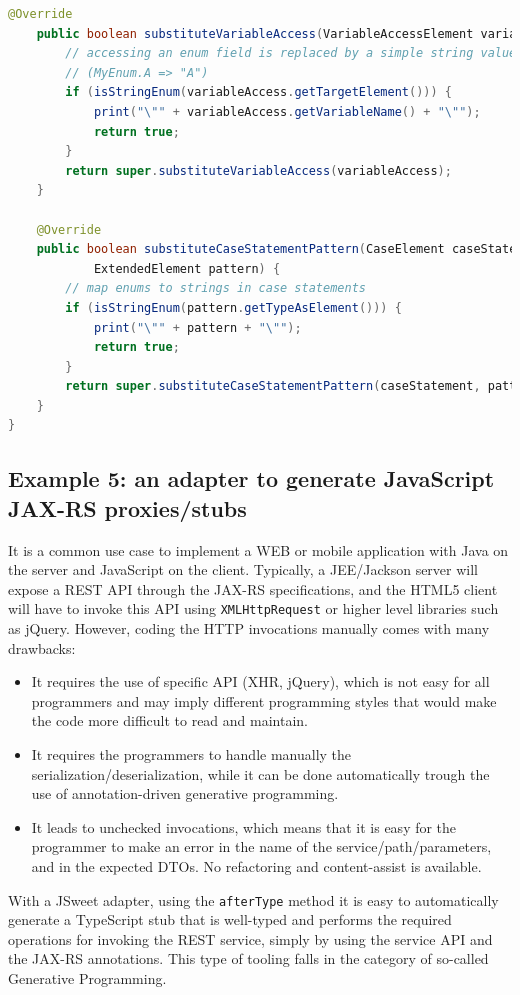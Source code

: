 \documentclass[a4paper]{report}
\begin{document}
\begin{lstlisting}[language=Java]
	@Override
	public boolean substituteVariableAccess(VariableAccessElement variableAccess) {
		// accessing an enum field is replaced by a simple string value
		// (MyEnum.A => "A")
		if (isStringEnum(variableAccess.getTargetElement())) {
			print("\"" + variableAccess.getVariableName() + "\"");
			return true;
		}
		return super.substituteVariableAccess(variableAccess);
	}

	@Override
	public boolean substituteCaseStatementPattern(CaseElement caseStatement, 
			ExtendedElement pattern) {
		// map enums to strings in case statements
		if (isStringEnum(pattern.getTypeAsElement())) {
			print("\"" + pattern + "\"");
			return true;
		}
		return super.substituteCaseStatementPattern(caseStatement, pattern);
	}
}
\end{lstlisting}

\subsection{Example 5: an adapter to generate JavaScript JAX-RS proxies/stubs}

It is a common use case to implement a WEB or mobile application with Java on the server and JavaScript on the client. Typically, a JEE/Jackson server will expose a REST API through the JAX-RS specifications, and the HTML5 client will have to invoke this API using \texttt{XMLHttpRequest} or higher level libraries such as jQuery. However, coding the HTTP invocations manually comes with many drawbacks:

\begin{itemize}
\item It requires the use of specific API (XHR, jQuery), which is not easy for all programmers and may imply different programming styles that would make the code more difficult to read and maintain.
\item It requires the programmers to handle manually the serialization/deserialization, while it can be done automatically trough the use of annotation-driven generative programming.
\item It leads to unchecked invocations, which means that it is easy for the programmer to make an error in the name of the service/path/parameters, and in the expected DTOs. No refactoring and content-assist is available.
\end{itemize}

With a JSweet adapter, using the \texttt{afterType} method it is easy to automatically generate a TypeScript stub that is well-typed and performs the required operations for invoking the REST service, simply by using the service API and the JAX-RS annotations. This type of tooling falls in the category of so-called Generative Programming. 
\end{document}
